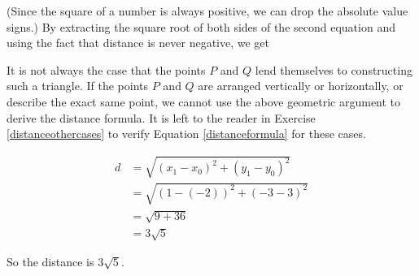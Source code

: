 (Since the square of a number is always positive, we can drop the absolute value signs.) By extracting the square root of both sides of the second equation and using the fact that distance is never negative, we get
 
\medskip
 

\medskip

It is not always the case that the points $P$ and $Q$ lend themselves to constructing such a triangle.  If the points $P$ and $Q$ are arranged vertically or horizontally, or describe the exact same point, we cannot use the above geometric argument to derive the distance formula.  It is left to the reader in Exercise \ref{distanceothercases} to verify Equation \ref{distanceformula} for these cases.

\pagebreak

{
\begin{align*}
 d & =  \sqrt{\left(x_{1} - x_{0} \right)^2 + \left(y_{1} - y_{0} \right)^2} \\
   & =  \sqrt{ (1-(-2))^2 + (-3-3)^2} \\
   & =  \sqrt{9 + 36} \\
   & =  3 \sqrt{5}
\end{align*}

So the distance is $3 \sqrt{5}$. 
}

\medskip

